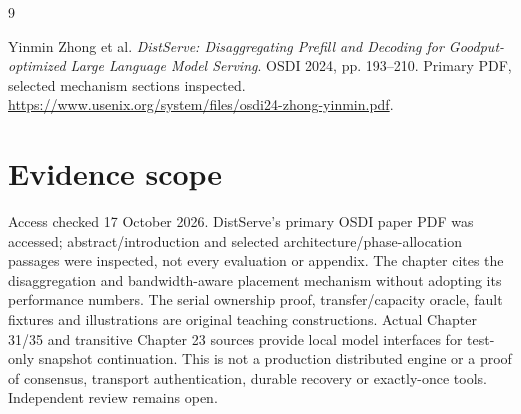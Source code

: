 \begin{thebibliography}{9}
 Yinmin Zhong et al.
\emph{DistServe: Disaggregating Prefill and Decoding for Goodput-optimized
Large Language Model Serving}. OSDI 2024, pp. 193--210.
Primary PDF, selected mechanism sections inspected.
\url{https://www.usenix.org/system/files/osdi24-zhong-yinmin.pdf}.
\end{thebibliography}

\section*{Evidence scope}
Access checked 17 October 2026. DistServe's primary OSDI paper PDF was accessed;
abstract/introduction and selected architecture/phase-allocation passages were
inspected, not every evaluation or appendix. The chapter cites the disaggregation
and bandwidth-aware placement mechanism without adopting its performance
numbers. The serial ownership proof, transfer/capacity oracle, fault fixtures
and illustrations are original teaching constructions.
Actual Chapter 31/35 and transitive Chapter 23 sources provide local model
interfaces for test-only snapshot continuation. This is not a production
distributed engine or a proof of consensus, transport authentication, durable
recovery or exactly-once tools. Independent review remains open.
